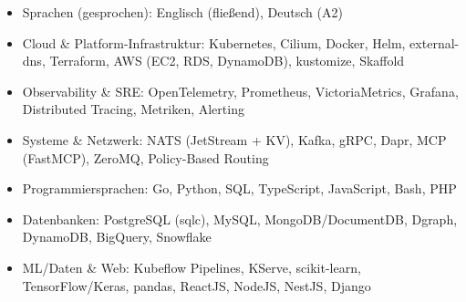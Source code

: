 \documentclass[10pt,a4paper]{resume}
\begin{document}
\begin{itemize}[leftmargin=1.4em,nosep,topsep=2pt]
  \item Sprachen (gesprochen): Englisch (fließend), Deutsch (A2)
  \item Cloud \& Platform-Infrastruktur: Kubernetes, Cilium, Docker, Helm, external-dns, Terraform, AWS (EC2, RDS, DynamoDB), kustomize, Skaffold
  \item Observability \& SRE: OpenTelemetry, Prometheus, VictoriaMetrics, Grafana, Distributed Tracing, Metriken, Alerting
  \item Systeme \& Netzwerk: NATS (JetStream + KV), Kafka, gRPC, Dapr, MCP (FastMCP), ZeroMQ, Policy-Based Routing
  \item Programmiersprachen: Go, Python, SQL, TypeScript, JavaScript, Bash, PHP
  \item Datenbanken: PostgreSQL (sqlc), MySQL, MongoDB/DocumentDB, Dgraph, DynamoDB, BigQuery, Snowflake
  \item ML/Daten \& Web: Kubeflow Pipelines, KServe, scikit-learn, TensorFlow/Keras, pandas, ReactJS, NodeJS, NestJS, Django
\end{itemize}
\end{document}
